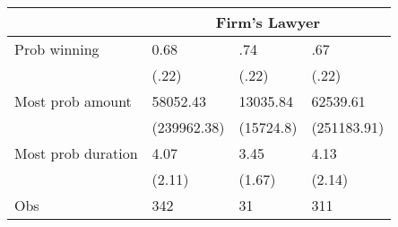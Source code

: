 \begin{tabular}{rrrr}
\midrule
\multicolumn{1}{l}{} & \multicolumn{3}{c}{Firm's Lawyer} \\
\midrule
\midrule
\multicolumn{1}{l}{Prob winning} & \multicolumn{1}{l}{0.68} & \multicolumn{1}{l}{.74} & \multicolumn{1}{l}{.67} \\
\multicolumn{1}{l}{} & \multicolumn{1}{l}{(.22)} & \multicolumn{1}{l}{(.22)} & \multicolumn{1}{l}{(.22)} \\
\multicolumn{1}{l}{Most prob amount} & \multicolumn{1}{l}{58052.43} & \multicolumn{1}{l}{13035.84} & \multicolumn{1}{l}{62539.61} \\
\multicolumn{1}{l}{} & \multicolumn{1}{l}{(239962.38)} & \multicolumn{1}{l}{(15724.8)} & \multicolumn{1}{l}{(251183.91)} \\
\multicolumn{1}{l}{Most prob duration} & \multicolumn{1}{l}{4.07} & \multicolumn{1}{l}{3.45} & \multicolumn{1}{l}{4.13} \\
\multicolumn{1}{l}{} & \multicolumn{1}{l}{(2.11)} & \multicolumn{1}{l}{(1.67)} & \multicolumn{1}{l}{(2.14)} \\
\multicolumn{1}{l}{Obs} & \multicolumn{1}{l}{342} & \multicolumn{1}{l}{31} & \multicolumn{1}{l}{311} \\
\bottomrule
\bottomrule
\end{tabular}%
